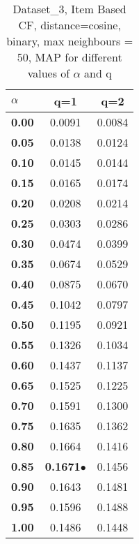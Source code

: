 \begin{table}
\begin{center}
\begin{tabular}{ | l || c | c |}
\hline
\textbf{$\alpha$} & \textbf{q=1} & \textbf{q=2} \\
\hline
\textbf{0.00} & 0.0091 & 0.0084\\
\hline
\textbf{0.05} & 0.0138 & 0.0124\\
\hline
\textbf{0.10} & 0.0145 & 0.0144\\
\hline
\textbf{0.15} & 0.0165 & 0.0174\\
\hline
\textbf{0.20} & 0.0208 & 0.0214\\
\hline
\textbf{0.25} & 0.0303 & 0.0286\\
\hline
\textbf{0.30} & 0.0474 & 0.0399\\
\hline
\textbf{0.35} & 0.0674 & 0.0529\\
\hline
\textbf{0.40} & 0.0875 & 0.0670\\
\hline
\textbf{0.45} & 0.1042 & 0.0797\\
\hline
\textbf{0.50} & 0.1195 & 0.0921\\
\hline
\textbf{0.55} & 0.1326 & 0.1034\\
\hline
\textbf{0.60} & 0.1437 & 0.1137\\
\hline
\textbf{0.65} & 0.1525 & 0.1225\\
\hline
\textbf{0.70} & 0.1591 & 0.1300\\
\hline
\textbf{0.75} & 0.1635 & 0.1362\\
\hline
\textbf{0.80} & 0.1664 & 0.1416\\
\hline
\textbf{0.85} & \textbf{0.1671}$\bullet$ & 0.1456\\
\hline
\textbf{0.90} & 0.1643 & 0.1481\\
\hline
\textbf{0.95} & 0.1596 & 0.1488\\
\hline
\textbf{1.00} & 0.1486 & 0.1448\\
\hline
\end{tabular}
\caption{Dataset\_3, Item Based CF, distance=cosine, binary, max neighbours = 50, MAP for different values of $\alpha$ and q}
\label{table:MAP_Dataset_3_icf_cosine_binary_mnn=50}
\end{center}
\end{table}
